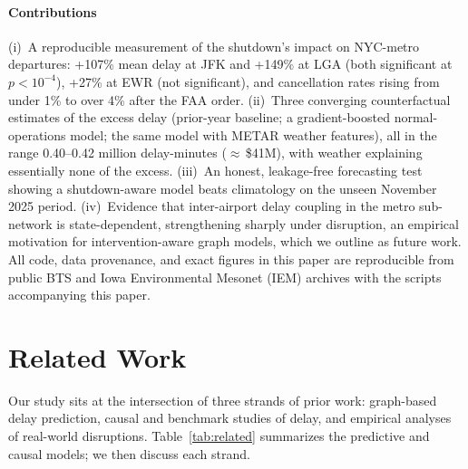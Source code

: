\documentclass[10pt,journal]{IEEEtran}
\begin{document}
\paragraph{Contributions}
(i)~A reproducible measurement of the shutdown's impact on NYC-metro
departures: +107\% mean delay at JFK and +149\% at LGA (both significant at
$p<10^{-4}$), +27\% at EWR (not significant), and cancellation rates rising
from under 1\% to over 4\% after the FAA order.
(ii)~Three converging counterfactual estimates of the excess delay
(prior-year baseline; a gradient-boosted normal-operations model; the same
model with METAR weather features), all in the range 0.40--0.42 million
delay-minutes ($\approx$\,\$41M), with weather explaining essentially none of
the excess.
(iii)~An honest, leakage-free forecasting test showing a shutdown-aware model
beats climatology on the unseen November 2025 period.
(iv)~Evidence that inter-airport delay coupling in the metro sub-network is
state-dependent, strengthening sharply under disruption, an empirical
motivation for intervention-aware graph models, which we outline as future
work.
All code, data provenance, and exact figures in this paper are reproducible
from public BTS and Iowa Environmental Mesonet (IEM) archives with the scripts
accompanying this paper.

\section{Related Work}
\label{sec:related}
Our study sits at the intersection of three strands of prior work: graph-based
delay prediction, causal and benchmark studies of delay, and empirical
analyses of real-world disruptions. Table~\ref{tab:related} summarizes the
predictive and causal models; we then discuss each strand.
\end{document}

